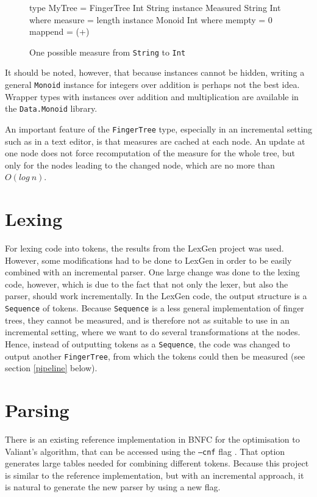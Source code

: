 \documentclass[a4paper,12pt,twosided]{report}
\renewcommand\cite{\citep}
\begin{document}
\begin{figure}[H]
\begin{code}
type MyTree = FingerTree Int String
instance Measured String Int where
    measure = length
instance Monoid Int where
    mempty = 0
    mappend = (+)
\end{code}
\caption{One possible measure from \texttt{String} to \texttt{Int}}
\end{figure}
It should be noted, however, that because instances cannot be hidden, writing a
general \texttt{Monoid} instance for integers over addition is perhaps not the
best idea. Wrapper types with instances over addition and multiplication are
available in the \texttt{Data.Monoid} library. 

An important feature of the \texttt{FingerTree} type, especially in an incremental
setting such as in a text editor, is that measures are cached at each node. An
update at one node does not force recomputation of the measure for the whole
tree, but only for the nodes leading to the changed node, which are no more than
$O(log\ n)$. 

\section{Lexing}
For lexing code into tokens, the results from the LexGen project was used.
However, some modifications had to be done to LexGen in order to be easily
combined with an incremental parser. One large change was done to the lexing
code, however, which is due to the fact that not only the lexer, but also the
parser, should work incrementally. In the LexGen code, the output structure is a
\texttt{Sequence} of tokens. Because \texttt{Sequence} is a less general
implementation of finger trees, they cannot be measured, and is therefore not as
suitable to use in an incremental setting, where we want to do several
transformations at the nodes. Hence, instead of outputting tokens
as a \texttt{Sequence}, the code was changed to output another
\texttt{FingerTree}, from which the tokens could then be measured (see section
\ref{pipeline} below).

\section{Parsing}
There is an existing reference implementation in BNFC for the optimisation to
Valiant's algorithm, that can be accessed using the \texttt{---cnf} flag
\cite{parparsepaper}. That option generates large tables needed for combining
different tokens. Because this project is similar to the reference
implementation, but with an incremental approach, it is natural to generate the
new parser by using a new flag.
\end{document}
